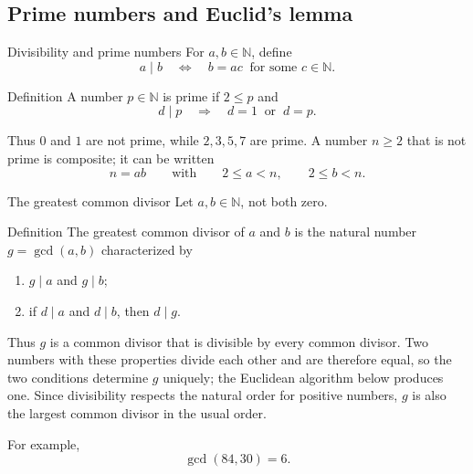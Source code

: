\documentclass[aspectratio=169,11pt]{beamer}
\newcommand{\N}{\mathbb N}
\begin{document}
\subsection{Prime numbers and Euclid's lemma}

\begin{frame}{Divisibility and prime numbers}
  For \(a,b\in\N\), define
  \[
    a\mid b
    \quad\Longleftrightarrow\quad
    b=ac\ \text{ for some }c\in\N.
  \]

  \begin{block}{Definition}
    A number \(p\in\N\) is \alert{prime} if \(2\le p\) and
    \[
      d\mid p
      \quad\Longrightarrow\quad
      d=1\ \text{ or }\ d=p.
    \]
  \end{block}

  Thus \(0\) and \(1\) are not prime, while \(2,3,5,7\) are prime.  A number
  \(n\ge2\) that is not prime is \alert{composite}; it can be written
  \[
    n=ab
    \qquad\text{with}\qquad
    2\le a<n,\qquad 2\le b<n.
  \]
\end{frame}

\begin{frame}{The greatest common divisor}
  Let \(a,b\in\N\), not both zero.

  \begin{block}{Definition}
    The \alert{greatest common divisor} of \(a\) and \(b\) is the natural
    number \(g=\gcd(a,b)\) characterized by
    \begin{enumerate}
      \item \(g\mid a\) and \(g\mid b\);
      \item if \(d\mid a\) and \(d\mid b\), then \(d\mid g\).
    \end{enumerate}
  \end{block}

  Thus \(g\) is a common divisor that is divisible by every common divisor.
  Two numbers with these properties divide each other and are therefore
  equal, so the two conditions determine \(g\) uniquely; the Euclidean
  algorithm below produces one.  Since divisibility respects the natural
  order for positive numbers, \(g\) is also the largest common divisor in
  the usual order.

  For example,
  \[
    \gcd(84,30)=6.
  \]
\end{frame}
\end{document}
